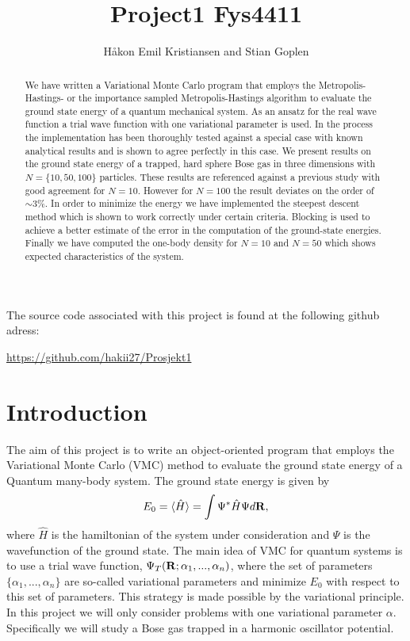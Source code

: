 \documentclass[a4paper,10pt]{article}
\title{Project1 Fys4411}
\author{Håkon Emil Kristiansen and Stian Goplen}
\begin{document}
\maketitle
\newpage
\tableofcontents

\newpage

The source code associated with this project is found at the following github adress: 

\href{https://github.com/hakii27/Prosjekt1}{https://github.com/hakii27/Prosjekt1}

\begin{abstract}
We have written a Variational Monte Carlo program that employs the Metropolis-Hastings- or the importance
sampled Metropolis-Hastings algorithm to evaluate the ground state energy of a quantum mechanical system. As an ansatz for the real
wave function a trial wave function with one variational parameter is used. In the process the implementation has been thoroughly 
tested against a special case with known analytical results and is shown to agree perfectly in this case. 
We present results on the ground state energy of a trapped, hard sphere Bose gas in three dimensions with
$N=\{10,50,100\}$ particles. These results are referenced against a previous study with good agreement for $N=10$. However for $N=100$ the result deviates on the order
of $\sim3\%$. In order to minimize the energy we have implemented the steepest descent method 
which is shown to work correctly under certain criteria. Blocking is used to achieve a better estimate of the error in the computation 
of the ground-state energies. Finally we have computed the one-body density for $N=10$ and $N=50$ which shows expected characteristics of the system.
\end{abstract}

\section{Introduction}
The aim of this project is to write an object-oriented program that employs the Variational Monte Carlo (VMC) method 
to evaluate the ground state energy of a Quantum many-body system. The ground state energy is given by
\begin{equation}
 E_0 = \langle \hat{H} \rangle = \int \Psi^* \hat{H} \Psi d{\bf R},
\end{equation}
where $\hat{H}$ is the hamiltonian of the system under consideration and $\Psi$ is the wavefunction of the ground state.
The main idea of VMC for quantum systems is to use a trial wave function, $\Psi_T({\bf R}; \alpha_1,...,\alpha_n)$, where the set
of parameters $\{ \alpha_1,...,\alpha_n\}$ are so-called variational parameters and minimize $E_0$ with respect to this set of parameters. This strategy is made possible by the variational principle. In this project
we will only consider problems with one variational parameter $\alpha$. Specifically we will study a Bose gas trapped in a harmonic oscillator potential.
\end{document}

